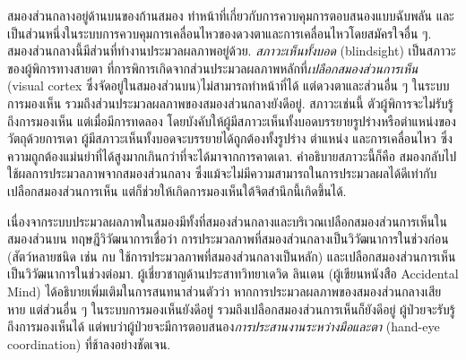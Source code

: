 {\begin{shaded}
		สมองส่วนกลางอยู่ด้านบนของก้านสมอง ทำหน้าที่เกี่ยวกับการควบคุมการตอบสนองแบบฉับพลัน และเป็นส่วนหนึ่งในระบบการควบคุมการเคลื่อนไหวของดวงตาและการเคลื่อนไหวโดยสมัครใจอื่น ๆ.
		สมองส่วนกลางนี้มีส่วนที่ทำงานประมวลผลภาพอยู่ด้วย.
		\textit{สภาวะเห็นทั้งบอด} (blindsight) เป็นสภาวะของผู้พิการทางสายตา ที่การพิการเกิดจากส่วนประมวลผลภาพหลักที่\textit{เปลือกสมองส่วนการเห็น} (visual cortex ซึ่งจัดอยู่ในสมองส่วนบน)ไม่สามารถทำหน้าที่ได้ แต่ดวงตาและส่วนอื่น ๆ ในระบบการมองเห็น รวมถึงส่วนประมวลผลภาพของสมองส่วนกลางยังดีอยู่.
		สภาวะเช่นนี้ ตัวผู้พิการจะไม่รับรู้ถึงการมองเห็น 
		แต่เมื่อมีการทดลอง
		โดยบังคับให้ผู้มีสภาวะเห็นทั้งบอดบรรยายรูปร่างหรือตำแหน่งของวัตถุด้วยการเดา
		ผู้มีสภาวะเห็นทั้งบอดจะบรรยายได้ถูกต้องทั้งรูปร่าง ตำแหน่ง และการเคลื่อนไหว
		ซึ่งความถูกต้องแม่นยำที่ได้สูงมากเกินกว่าที่จะได้มาจากการคาดเดา.
		คำอธิบายสภาวะนี้ก็คือ สมองกลับไปใช้ผลการประมวลภาพจากสมองส่วนกลาง ซึ่งแม้จะไม่มีความสามารถในการประมวลผลได้ดีเท่ากับเปลือกสมองส่วนการเห็น
		แต่ก็ช่วยให้เกิดการมองเห็นใต้จิตสำนึกนี้เกิดขึ้นได้.
		
		เนื่องจากระบบประมวลผลภาพในสมองมีทั้งที่สมองส่วนกลางและบริเวณเปลือกสมองส่วนการเห็นในสมองส่วนบน ทฤษฎีวิวัฒนาการเชื่อว่า
		การประมวลภาพที่สมองส่วนกลางเป็นวิวัฒนาการในช่วงก่อน
		(สัตว์หลายชนิด เช่น กบ ใช้การประมวลภาพที่สมองส่วนกลางเป็นหลัก)
		และเปลือกสมองส่วนการเห็นเป็นวิวัฒนาการในช่วงต่อมา.
		ผู้เชี่ยวชาญด้านประสาทวิทยาเดวิด ลินเดน (ผู้เขียนหนังสือ 
		Accidental Mind\cite{Linden2008a}) ได้อธิบายเพิ่มเติมในการสนทนาส่วนตัวว่า
		หากการประมวลผลภาพของสมองส่วนกลางเสียหาย แต่ส่วนอื่น ๆ ในระบบการมองเห็นยังดีอยู่ รวมถึงเปลือกสมองส่วนการเห็นก็ยังดีอยู่
		ผู้ป่วยจะรับรู้ถึงการมองเห็นได้ แต่พบว่าผู้ป่วยจะมีการตอบสนอง\textit{การประสานงานระหว่างมือและตา} (hand-eye coordination) ที่ช้าลงอย่างชัดเจน.
		
		
		

\end{shaded}}
